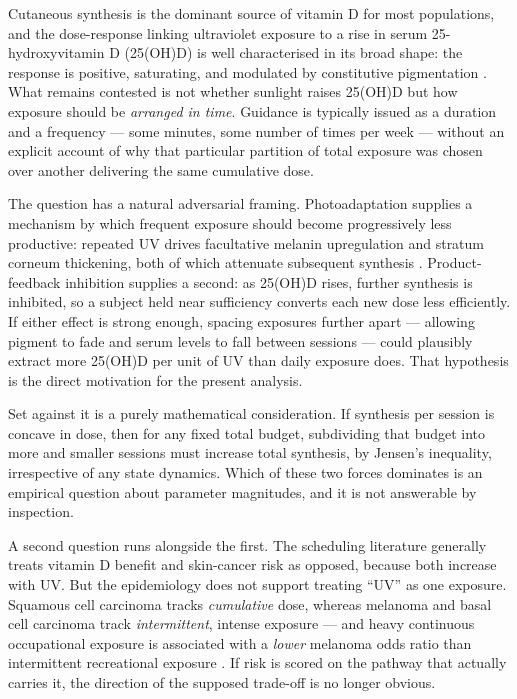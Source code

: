 \documentclass[11pt]{article}
\begin{document}
Cutaneous synthesis is the dominant source of vitamin D for most
populations, and the dose-response linking ultraviolet exposure to a
rise in serum 25-hydroxyvitamin D (25(OH)D) is well characterised in
its broad shape: the response is positive, saturating, and modulated
by constitutive pigmentation \citep{webb2021,young2021pnas,young2020}.
What remains contested is not whether sunlight raises 25(OH)D but how
exposure should be \emph{arranged in time}. Guidance is typically
issued as a duration and a frequency --- some minutes, some number of
times per week --- without an explicit account of why that particular
partition of total exposure was chosen over another delivering the
same cumulative dose.

The question has a natural adversarial framing. Photoadaptation
supplies a mechanism by which frequent exposure should become
progressively less productive: repeated UV drives facultative melanin
upregulation and stratum corneum thickening, both of which attenuate
subsequent synthesis \citep{deboer2025,pearse1987,datta2019}.
Product-feedback inhibition supplies a second: as 25(OH)D rises,
further synthesis is inhibited, so a subject held near sufficiency
converts each new dose less efficiently. If either effect is strong
enough, spacing exposures further apart --- allowing pigment to fade
and serum levels to fall between sessions --- could plausibly extract
more 25(OH)D per unit of UV than daily exposure does. That hypothesis
is the direct motivation for the present analysis.

Set against it is a purely mathematical consideration. If synthesis
per session is concave in dose, then for any fixed total budget,
subdividing that budget into more and smaller sessions must increase
total synthesis, by Jensen's inequality, irrespective of any state
dynamics. Which of these two forces dominates is an empirical question
about parameter magnitudes, and it is not answerable by inspection.

A second question runs alongside the first. The scheduling literature
generally treats vitamin D benefit and skin-cancer risk as opposed,
because both increase with UV. But the epidemiology does not support
treating ``UV'' as one exposure. Squamous cell carcinoma tracks
\emph{cumulative} dose, whereas melanoma and basal cell carcinoma
track \emph{intermittent}, intense exposure --- and heavy continuous
occupational exposure is associated with a \emph{lower} melanoma odds
ratio than intermittent recreational exposure
\citep{elwood1997,leiter2009,calzavarapinton2015}. If risk is scored
on the pathway that actually carries it, the direction of the
supposed trade-off is no longer obvious.
\end{document}
